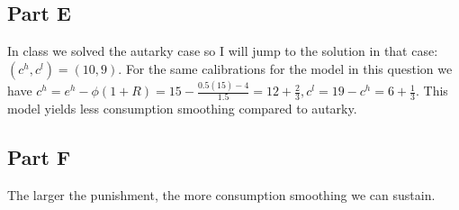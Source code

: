 \documentclass[11pt]{article} %
\begin{document}
\subsection{Part E}
In class we solved the autarky case so I will jump to the solution in that case: $(c^h,c^l) = (10,9)$. For the same calibrations for the model in this question we have $ c^h = e^h - \phi(1+R) = 15 - \frac{0.5(15) - 4}{1.5} = 12 +\frac{2}{3}, c^l = 19-c^h = 6 + \frac{1}{3}$. This model yields less consumption smoothing compared to autarky.
\subsection{Part F}
The larger the punishment, the more consumption smoothing we can sustain.
\end{document}
